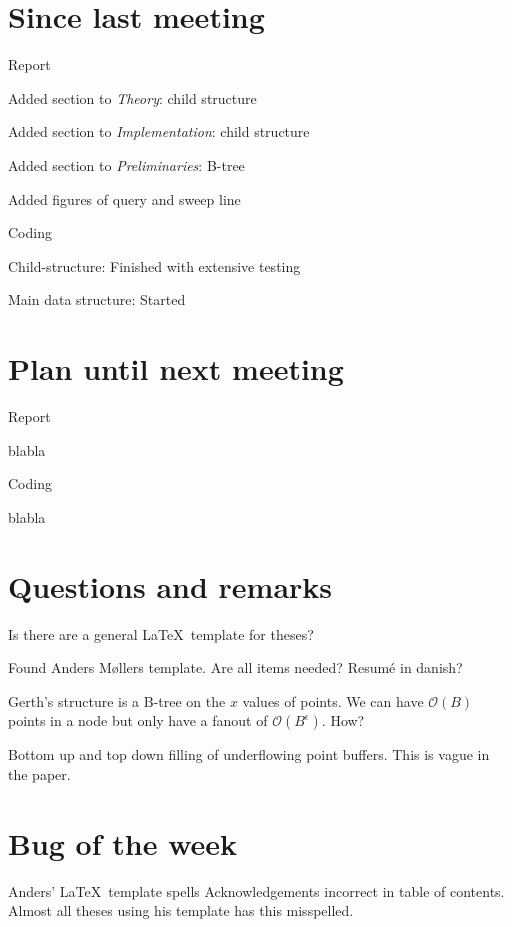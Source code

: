 \documentclass[a4paper,11pt,agenda,chair]{meetingmins}
\begin{document}
\maketitle

\section{Since last meeting}
\begin{items}
\item Report
	\begin{items}
		\item Added section to \textit{Theory}: child structure
		\item Added section to \textit{Implementation}: child structure
        \item Added section to \textit{Preliminaries}: B-tree
        \item Added figures of query and sweep line
	\end{items}
\item Coding
	\begin{items}
		\item Child-structure: Finished with extensive testing
		\item Main data structure: Started
	\end{items}
\end{items}

\section{Plan until next meeting}
\begin{items}
\item Report
	\begin{items}
		\item blabla
	\end{items}
\item Coding
	\begin{items}
		\item blabla
	\end{items}
\end{items}

\section{Questions and remarks}
\begin{items}
	\item Is there are a general \LaTeX~template for theses?
		\begin{items}
			\item Found Anders M\o llers template. Are all items needed? Resum\'e in danish?
		\end{items}
\item Gerth's structure is a B-tree on the $x$ values of points. We can have $\mathcal{O}(B)$ points in a node but only have a fanout of $\mathcal{O}(B^\epsilon)$. How?

\item Bottom up and top down filling of underflowing point buffers. This is vague in the paper.

\end{items}



\section{Bug of the week}
Anders' \LaTeX~template spells Acknowledgements incorrect in table of contents. Almost all theses using his template has this misspelled.
\end{document}
